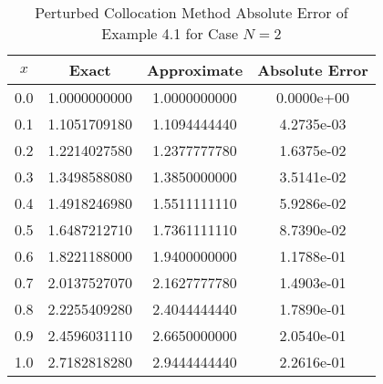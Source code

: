 \documentclass[12pt]{report}
\begin{document}
	\begin{table}[!hbt]
		\caption{Perturbed Collocation Method Absolute Error of Example 4.1 for Case $N=2$}
		\begin{center}
			\begin{tabular}{|c||c||c||c||}
				\hline
				$x$ & Exact & Approximate & Absolute Error\\ \hline
				0.0 & 1.0000000000 & 1.0000000000 & 0.0000e+00\\ \hline
				0.1 & 1.1051709180 & 1.1094444440 & 4.2735e-03\\ \hline
				0.2 & 1.2214027580 & 1.2377777780 & 1.6375e-02\\ \hline
				0.3 & 1.3498588080 & 1.3850000000 & 3.5141e-02\\ \hline
				0.4 & 1.4918246980 & 1.5511111110 & 5.9286e-02\\ \hline
				0.5 & 1.6487212710 & 1.7361111110 & 8.7390e-02\\ \hline
				0.6 & 1.8221188000 & 1.9400000000 & 1.1788e-01\\ \hline
				0.7 & 2.0137527070 & 2.1627777780 & 1.4903e-01\\ \hline
				0.8 & 2.2255409280 & 2.4044444440 & 1.7890e-01\\ \hline
				0.9 & 2.4596031110 & 2.6650000000 & 2.0540e-01\\ \hline
				1.0 & 2.7182818280 & 2.9444444440 & 2.2616e-01\\ \hline
			\end{tabular}
		\end{center}
		\label{tb:4_4}
	\end{table}	
	
\end{document}
